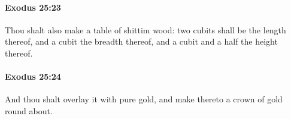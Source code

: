 		\paragraph{Exodus 25:23} %
			\label{EXODUS-25-23}

			Thou shalt also make a table of shittim wood: two cubits shall be the length thereof, and a cubit the breadth thereof, and a cubit and a half the height thereof.


		\paragraph{Exodus 25:24} %
			\label{EXODUS-25-24}

			And thou shalt overlay it with pure gold, and make thereto a crown of gold round about.


